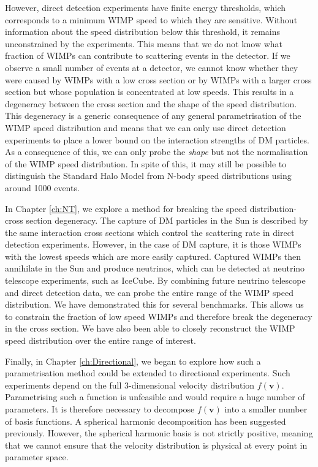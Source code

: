 However, direct detection experiments have finite energy thresholds, which corresponds to a minimum WIMP speed to which they are sensitive. Without information about the speed distribution below this threshold, it remains unconstrained by the experiments. This means that we do not know what fraction of WIMPs can contribute to scattering events in the detector. If we observe a small number of events at a detector, we cannot know whether they were caused by WIMPs with a low cross section or by WIMPs with a larger cross section but whose population is concentrated at low speeds. This results in a degeneracy between the cross section and the shape of the speed distribution. This degeneracy is a generic consequence of any general parametrisation of the WIMP speed distribution and means that we can only use direct detection experiments to place a lower bound on the interaction strengths of DM particles. As a consequence of this, we can only probe the \textit{shape} but not the normalisation of the WIMP speed distribution. In spite of this, it may still be possible to distinguish the Standard Halo Model from N-body speed distributions using around 1000 events.

In Chapter \ref{ch:NT}, we explore a method for breaking the speed distribution-cross section degeneracy. The capture of DM particles in the Sun is described by the same interaction cross sections which control the scattering rate in direct detection experiments. However, in the case of DM capture, it is those WIMPs with the lowest speeds which are more easily captured. Captured WIMPs then annihilate in the Sun and produce neutrinos, which can be detected at neutrino telescope experiments, such as IceCube. By combining future neutrino telescope and direct detection data, we can probe the entire range of the WIMP speed distribution. We have demonstrated this for several benchmarks. This allows us to constrain the fraction of low speed WIMPs and therefore break the degeneracy in the cross section. We have also been able to closely reconstruct the WIMP speed distribution over the entire range of interest. 

Finally, in Chapter \ref{ch:Directional}, we began to explore how such a parametrisation method could be extended to directional experiments. Such experiments depend on the full 3-dimensional velocity distribution $f(\textbf{v})$. Parametrising such a function is unfeasible and would require a huge number of parameters. It is therefore necessary to decompose $f(\textbf{v})$ into a smaller number of basis functions. A spherical harmonic decomposition has been suggested previously. However, the spherical harmonic basis is not strictly positive, meaning that we cannot ensure that the velocity distribution is physical at every point in parameter space. 

